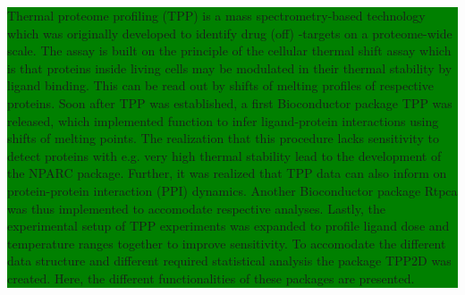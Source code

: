 \documentclass{article}
\newcommand{\hcode}[2][lgray]{{\ttfamily\color{vdgray}\colorbox{#1}{#2}}}
\begin{document}
\noindent
\colorbox{green}{
  \noindent
  \begin{minipage}[t]{\textwidth}
    \vspace{.15cm}
    \large 
      Thermal proteome profiling (TPP) is a mass spectrometry-based 
      technology which was originally developed to identify drug (off)
      -targets on a proteome-wide scale. The assay is built on the principle
      of the cellular thermal shift assay which is that proteins inside living
      cells may be modulated in their thermal stability by ligand binding.
      This can be read out by shifts of melting profiles of respective proteins. 
      Soon after TPP was established, a first Bioconductor package \hcode{TPP} 
      was released, which implemented function to infer ligand-protein interactions
      using shifts of melting points. The realization that this procedure 
      lacks sensitivity to detect proteins with e.g. very high thermal stability lead 
      to the development of the \hcode{NPARC} package. 
      Further, it was realized that TPP data can also inform on protein-protein 
      interaction (PPI) dynamics. Another Bioconductor package \hcode{Rtpca} was thus implemented
      to accomodate respective analyses. 
      Lastly, the experimental setup of TPP experiments was expanded to profile ligand
      dose and temperature ranges together to improve sensitivity. To accomodate the 
      different data structure and different required statistical analysis the package
      \hcode{TPP2D} was created. Here, the different functionalities of these packages are presented. 
      
    \vspace{0.1cm}
  \end{minipage}
}
\vspace{-1cm}
\end{document}
